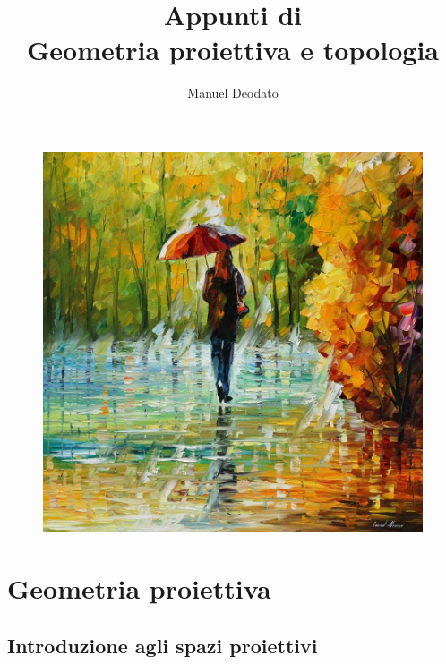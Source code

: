 \documentclass[12pt]{scrartcl}
\title{Appunti di\\ \vspace{.3cm} Geometria proiettiva e topologia}
\author{Manuel Deodato}
\date{}
\theoremstyle{style}
\renewcommand{\maketitle}{
\begin{center}
{\sffamily
{\fontsize{20}{20}\selectfont\MakeUppercase\thetitle}}

\vspace{0.2in}

{\large\scshape\theauthor}
\end{center}
}
\numberwithin{equation}{subsection}
\begin{document}
\pagestyle{plain}
\maketitle
\vspace{6cm}
\begin{figure}[h!]
	\centering
	\includegraphics[width=.7\columnwidth]{front1.jpeg}
\end{figure}

\newpage
\tableofcontents 
\newpage
\pagestyle{fancy}
\section{Geometria proiettiva}

\subsection{Introduzione agli spazi proiettivi}
\end{document}

